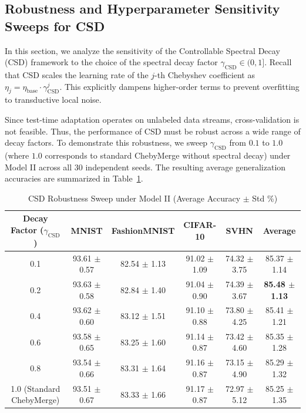 \documentclass{article}
\theoremstyle{plain}
\theoremstyle{definition}
\theoremstyle{remark}
\begin{document}
\subsection{Robustness and Hyperparameter Sensitivity Sweeps for CSD}
\label{sec:csd_robustness}
In this section, we analyze the sensitivity of the Controllable Spectral Decay (CSD) framework to the choice of the spectral decay factor $\gamma_{\text{CSD}} \in (0, 1]$. Recall that CSD scales the learning rate of the $j$-th Chebyshev coefficient as $\eta_j = \eta_{\text{base}} \cdot \gamma_{\text{CSD}}^j$. This explicitly dampens higher-order terms to prevent overfitting to transductive local noise.

Since test-time adaptation operates on unlabeled data streams, cross-validation is not feasible. Thus, the performance of CSD must be robust across a wide range of decay factors. To demonstrate this robustness, we sweep $\gamma_{\text{CSD}}$ from $0.1$ to $1.0$ (where $1.0$ corresponds to standard ChebyMerge without spectral decay) under Model II across all 30 independent seeds. The resulting average generalization accuracies are summarized in Table~\ref{tab:csd_robustness_sweep}.

\begin{table}[h]
\caption{CSD Robustness Sweep under Model II (Average Accuracy $\pm$ Std \%)}
\label{tab:csd_robustness_sweep}
\vskip 0.15in
\begin{center}
\begin{small}
\begin{tabular}{cccccc}
\toprule
Decay Factor ($\gamma_{\text{CSD}}$) & MNIST & FashionMNIST & CIFAR-10 & SVHN & \textbf{Average} \\
\midrule
0.1 & 93.61 $\pm$ 0.57 & 82.54 $\pm$ 1.13 & 91.02 $\pm$ 1.09 & 74.32 $\pm$ 3.75 & 85.37 $\pm$ 1.14 \\
0.2 & 93.63 $\pm$ 0.58 & 82.84 $\pm$ 1.40 & 91.04 $\pm$ 0.90 & 74.39 $\pm$ 3.67 & \textbf{85.48 $\pm$ 1.13} \\
0.4 & 93.62 $\pm$ 0.60 & 83.12 $\pm$ 1.51 & 91.10 $\pm$ 0.88 & 73.80 $\pm$ 4.25 & 85.41 $\pm$ 1.21 \\
0.6 & 93.58 $\pm$ 0.65 & 83.25 $\pm$ 1.60 & 91.14 $\pm$ 0.87 & 73.42 $\pm$ 4.60 & 85.35 $\pm$ 1.28 \\
0.8 & 93.54 $\pm$ 0.66 & 83.31 $\pm$ 1.64 & 91.16 $\pm$ 0.87 & 73.15 $\pm$ 4.90 & 85.29 $\pm$ 1.32 \\
1.0 (Standard ChebyMerge) & 93.51 $\pm$ 0.67 & 83.33 $\pm$ 1.66 & 91.17 $\pm$ 0.87 & 72.97 $\pm$ 5.12 & 85.25 $\pm$ 1.35 \\
\bottomrule
\end{tabular}
\end{small}
\end{center}
\vskip -0.1in
\end{table}
\end{document}
